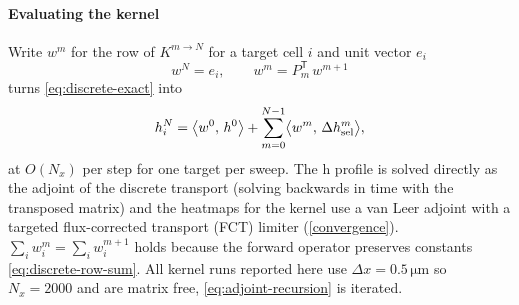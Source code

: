 \documentclass[11pt,a4paper]{report}
\begin{document}
	\paragraph{Evaluating the kernel}
Write \(w^m\) for the row of \(K^{m\to N}\) for a target cell \(i\) and unit vector \(e_i\)
\begin{equation}
	w^{N}=e_{i},
	\qquad
	w^{m}=P_m^{\mathsf T}\,w^{m+1}
	\label{eq:adjoint-recursion}
\end{equation}
turns \cref{eq:discrete-exact} into
\begin{equation}
	h^N_i=\bigl\langle w^{0},\,h^{0}\bigr\rangle
	+\sum_{m=0}^{N-1}\bigl\langle w^{m},\,\Delta h_{\rm sel}^m\bigr\rangle ,
	\label{eq:adjoint-pairing}
\end{equation}
at \(O(N_x)\) per step for one target per sweep. The h profile is solved directly as the adjoint of the discrete transport (solving backwards in time with the transposed matrix) and the heatmaps for the kernel use a van Leer adjoint with a targeted flux-corrected transport (FCT) limiter (\cref{convergence}). \(\sum_i w^m_i=\sum_i w^{m+1}_i\) holds because the forward operator preserves constants \cref{eq:discrete-row-sum}. All kernel runs reported here use \(\Delta x=0.5\,\mathrm{\mu m}\) so \(N_x=2000\) and
are matrix free, \eqref{eq:adjoint-recursion} is iterated.
\end{document}
